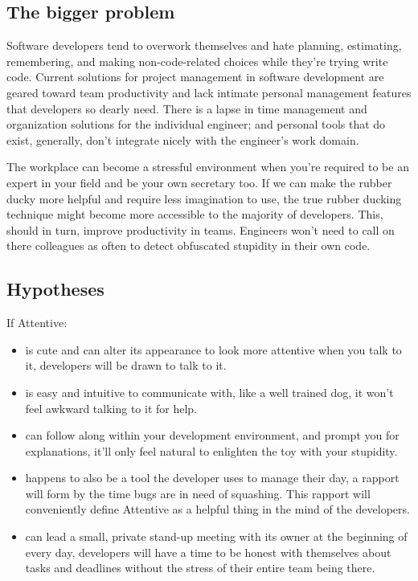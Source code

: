 \documentclass{article}
\begin{document}
\begin{multicols}{2}
\subsection{The bigger problem}
Software developers tend to overwork themselves and hate planning, estimating, remembering, and making non-code-related choices while they're trying write code. 
Current solutions for project management in software development are geared toward team productivity and lack intimate personal management features that developers so dearly need. 
There is a lapse in time management and organization solutions for the individual engineer; and personal tools that do exist, generally, don't integrate nicely with the engineer's work domain.

The workplace can become a stressful environment when you're required to be an expert in your field and be your own secretary too.
If we can make the rubber ducky more helpful and require less imagination to use, the true rubber ducking technique might become more accessible to the majority of developers.
This, should in turn, improve productivity in teams. 
Engineers won't need to call on there colleagues as often to detect obfuscated stupidity in their own code.

\subsection{Hypotheses}
If Attentive:
\begin{itemize}
    \item is cute and can alter its appearance to look more attentive when you talk to it, developers will be drawn to talk to it.
    \item is easy and intuitive to communicate with, like a well trained dog, it won't feel awkward talking to it for help.
    \item can follow along within your development environment, and prompt you for explanations, it'll only feel natural to enlighten the toy with your stupidity.
    \item happens to also be a tool the developer uses to manage their day, a rapport will form by the time bugs are in need of squashing. This rapport will conveniently define Attentive as a helpful thing in the mind of the developers.
    \item can lead a small, private stand-up meeting with its owner at the beginning of every day, developers will have a time to be honest with themselves about tasks and deadlines without the stress of their entire team being there.
\end{itemize}


\end{multicols}
\end{document}
